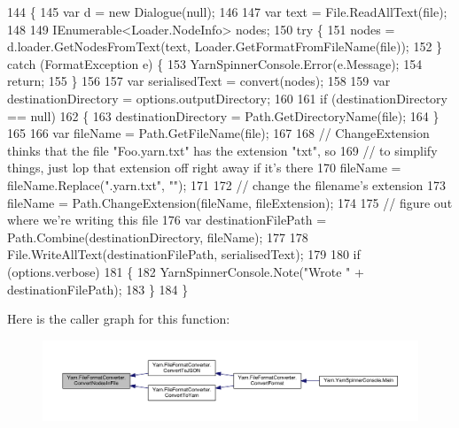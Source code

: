 \begin{DoxyCode}
144         \{
145             var d = \textcolor{keyword}{new} Dialogue(null);
146 
147             var text = File.ReadAllText(file);
148 
149             IEnumerable<Loader.NodeInfo> nodes;
150             \textcolor{keywordflow}{try} \{
151                 nodes = d.loader.GetNodesFromText(text, Loader.GetFormatFromFileName(file));
152             \} \textcolor{keywordflow}{catch} (FormatException e) \{
153                 YarnSpinnerConsole.Error(e.Message);
154                 \textcolor{keywordflow}{return};
155             \}
156 
157             var serialisedText = convert(nodes);
158 
159             var destinationDirectory = options.outputDirectory;
160 
161             \textcolor{keywordflow}{if} (destinationDirectory == null)
162             \{
163                 destinationDirectory = Path.GetDirectoryName(file);
164             \}
165 
166             var fileName = Path.GetFileName(file);
167 
168             \textcolor{comment}{// ChangeExtension thinks that the file "Foo.yarn.txt" has the extension "txt", so}
169             \textcolor{comment}{// to simplify things, just lop that extension off right away if it's there}
170             fileName = fileName.Replace(\textcolor{stringliteral}{".yarn.txt"}, \textcolor{stringliteral}{""});
171 
172             \textcolor{comment}{// change the filename's extension}
173             fileName = Path.ChangeExtension(fileName, fileExtension);
174 
175             \textcolor{comment}{// figure out where we're writing this file}
176             var destinationFilePath = Path.Combine(destinationDirectory, fileName);
177 
178             File.WriteAllText(destinationFilePath, serialisedText);
179 
180             \textcolor{keywordflow}{if} (options.verbose)
181             \{
182                 YarnSpinnerConsole.Note(\textcolor{stringliteral}{"Wrote "} + destinationFilePath);
183             \}
184         \}
\end{DoxyCode}


Here is the caller graph for this function\-:
\nopagebreak
\begin{figure}[H]
\begin{center}
\leavevmode
\includegraphics[width=350pt]{a00099_aa72838be584177b5592c31d73c0febdb_icgraph}
\end{center}
\end{figure}


